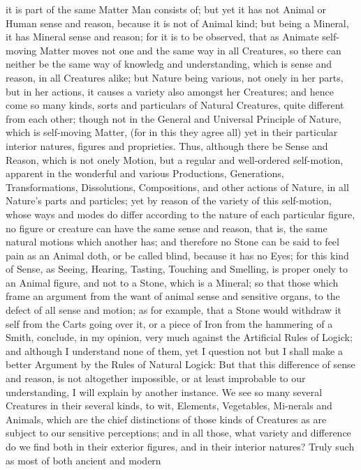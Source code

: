 it is part of the same Matter Man consists of; but yet it has not
Animal or Human sense and reason, because it is not of Animal kind;
but being a Mineral, it has Mineral sense and reason; for it is to be
observed, that as Animate self-moving Matter moves not one and the
same way in all Creatures, so there can neither be the same way of
knowledg and understanding, which is sense and reason, in all
Creatures alike; but Nature being various, not onely in her parts, but
in her actions, it causes a variety also amongst her Creatures; and
hence come so many kinds, sorts and particulars of Natural Creatures,
quite different from each other; though not in the General and
Universal Principle of Nature, which is self-moving Matter, (for in
this they agree all) yet in their particular interior natures, figures
and proprieties. Thus, although there be Sense  and Reason,
which is not onely Motion, but a regular and well-ordered self-motion,
apparent in the wonderful and various Productions, Generations,
Transformations, Dissolutions, Compositions, and other actions of
Nature, in all Nature's parts and particles; yet by reason of the
variety of this self-motion, whose ways and modes do differ according
to the nature of each particular figure, no figure or creature can
have the same sense and reason, that is, the same natural motions
which another has; and therefore no Stone can be said to feel pain as
an Animal doth, or be called blind, because it has no Eyes; for this
kind of Sense, as Seeing, Hearing, Tasting, Touching and Smelling, is
proper onely to an Animal figure, and not to a Stone, which is a
Mineral; so that those which frame an argument from the want of animal
sense and sensitive organs, to the defect of all sense and motion; as
for example, that a Stone would withdraw it self from the Carts going
over it, or a piece of Iron from the hammering of a Smith, conclude,
in my opinion, very much against the Artificial Rules of Logick; and
although I understand none of them, yet I question not but I shall
make a better Argument by the Rules of Natural Logick: But that this
difference of sense and reason, is not altogether impossible, or at
least improbable to our understanding, I will explain by another
instance. We see so many several Creatures in their several kinds, to
wit, Elements, Vegetables, Mi-nerals and Animals, which are
the chief distinctions of those kinds of Creatures as are subject to
our sensitive perceptions; and in all those, what variety and
difference do we find both in their exterior figures, and in their
interior natures? Truly such as most of both ancient and modern
